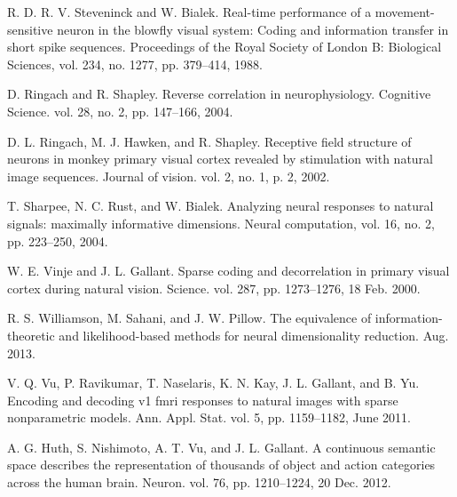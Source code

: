 \documentclass[10pt,letterpaper]{article}
\begin{document}
%
%
% 
\begin{thebibliography}{10}

R. D. R. V. Steveninck and W. Bialek.
\newblock Real-time performance of a movement-sensitive neuron in the blowfly visual system: Coding and information transfer in short spike sequences.
\newblock Proceedings of the Royal Society of London B: Biological Sciences, vol. 234, no. 1277, pp. 379--414, 1988.

D. Ringach and R. Shapley.
\newblock Reverse correlation in neurophysiology.
\newblock Cognitive Science. vol. 28, no. 2, pp. 147--166, 2004.

D. L. Ringach, M. J. Hawken, and R. Shapley.
\newblock Receptive field structure of neurons in monkey primary visual cortex revealed by stimulation with natural image sequences.
\newblock Journal of vision. vol. 2, no. 1, p. 2, 2002.

T. Sharpee, N. C. Rust, and W. Bialek.
\newblock Analyzing neural responses to natural signals: maximally informative dimensions.
\newblock Neural computation, vol. 16, no. 2, pp. 223--250, 2004.

W. E. Vinje and J. L. Gallant.
\newblock Sparse coding and decorrelation in primary visual cortex during natural vision.
\newblock Science. vol. 287, pp. 1273--1276, 18 Feb. 2000.

R. S. Williamson, M. Sahani, and J. W. Pillow.
\newblock The equivalence of information-theoretic and likelihood-based methods for neural dimensionality reduction. 
 Aug. 2013.

V. Q. Vu, P. Ravikumar, T. Naselaris, K. N. Kay, J. L. Gallant, and B. Yu.
\newblock Encoding and decoding v1 fmri responses to natural images with sparse nonparametric models.
\newblock Ann. Appl. Stat. vol. 5, pp. 1159--1182, June 2011.

A. G. Huth, S. Nishimoto, A. T. Vu, and J. L. Gallant.
\newblock A continuous semantic space describes the representation of thousands of object and action categories across the human brain.
\newblock Neuron. vol. 76, pp. 1210--1224, 20 Dec. 2012.


\end{thebibliography}
\end{document}

